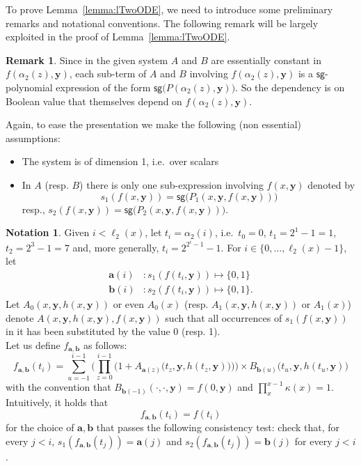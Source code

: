 \documentclass[11pt, oneside]{article}
\newcommand{\fun}[1]{\mathsf{#1}}
\newcommand{\tu}[1]{\mathbf{#1}}
\theoremstyle{definition}
\newtheorem{notation}{Notation}
\newtheorem{remark}{Remark}
\begin{document}
\begin{toappendix}
\bigskip 

To prove Lemma~\ref{lemma:lTwoODE}, we need to introduce some preliminary remarks and notational conventions.
%
The following remark will be largely exploited in the proof of Lemma~\ref{lemma:lTwoODE}.


\begin{remark}
    Since in the given system $A$ and $B$ are essentially constant in $f(\alpha_2(z), \tu y)$, each sub-term of $A$ and $B$ involving $f(\alpha_2(z), \tu y)$ is a $\fun{sg}$-polynomial expression of the form $\fun{sg}\big(P(\alpha_2(z), \tu y)\big)$.
    So the dependency is on Boolean value that themselves depend on $f(\alpha_2(z), \tu y)$.
\end{remark}
Again, to ease the presentation we make the following (non essential) assumptions:
\begin{itemize}
    \itemsep0em
    \item The system is of dimension 1, i.e.~over scalars
    \item In $A$ (resp. $B$) there is only one sub-expression involving $f(x, \tu y)$ denoted by
    $$
    s_1(f(x, \tu y)) = \fun{sg}\big(P_1(x, \tu y, f(x, \tu y))\big)
    $$
    resp., $s_2(f(x, \tu y))=\fun{sg}\big(P_2(x,\tu y, f(x, \tu y))\big)$.
\end{itemize}



\begin{notation}
    Given $i<\ell_2(x)$, let $t_i=\alpha_2(i)$, i.e.~$t_0=0$, $t_1=2^1-1=1$, $t_2=2^3-1 =7$ and, more generally, $t_i=2^{2^i-1}-1$.
    For $i\in \{0, \dots, \ell_2(x)-1\}$, let 
    \begin{align*}
        \tu a(i) &: s_1(f(t_i, \tu y)) \mapsto \{0,1\} \\
        \tu b(i) &: s_2(f(t_i, \tu y)) \mapsto \{0,1\}.
    \end{align*}
    Let
    $A_0(x, \tu y, h(x, \tu y))$ or even $A_0(x)$ (resp. $A_1(x, \tu y, h(x, \tu y))$ or $A_1(x)$) denote $A(x, \tu y, h(x, \tu y), f(x, \tu y))$ such that all occurrences of $s_1(f(x,\tu y))$ in it has been substituted by the value 0 (resp. 1).
    \\
    Let us define $f_{\tu a, \tu b}$ as follows:
    $$
        f_{\tu a, \tu b}(t_i) = \sum^{i-1}_{u=-1} \Bigg(\prod^{i-1}_{z=0} \bigg(1+A_{\tu a(z)}\Big(t_z, \tu y, h(t_z, \tu y)\Big)\bigg) \Bigg) \times B_{\tu b(u)} \big(t_u, \tu y, h(t_u, \tu y)\big)
    $$
    with the convention that $B_{\tu b(-1)} (\cdot, \cdot, \tu y) = f(0, \tu y)$ and $\prod^{x-1}_x \kappa(x)=1$.
    Intuitively, it holds that
    $$
    f_{\tu a, \tu b}(t_i) = f(t_i)
    $$
    for the choice of $\tu a, \tu b$ that passes the following consistency test: check that, for every $j<i$, 
    $s_1(f_{\tu a, \tu b}(t_j))=\tu a(j)$ and $s_2(f_{\tu a, \tu b}(t_j))=\tu b(j)$ for every $j<i$.
\end{notation}



\end{toappendix}
\end{document}
